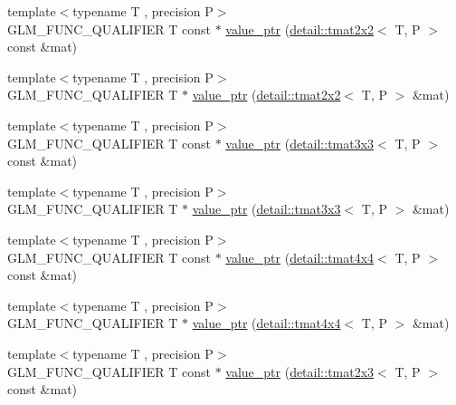 \begin{DoxyCompactItemize}
\item 
{\footnotesize template$<$typename T , precision P$>$ }\\G\-L\-M\-\_\-\-F\-U\-N\-C\-\_\-\-Q\-U\-A\-L\-I\-F\-I\-E\-R T const $\ast$ \hyperlink{group__gtc__type__ptr_ga013fcf415d78cc3aa9273c5d4f780325}{value\-\_\-ptr} (\hyperlink{structglm_1_1detail_1_1tmat2x2}{detail\-::tmat2x2}$<$ T, P $>$ const \&mat)
\item 
{\footnotesize template$<$typename T , precision P$>$ }\\G\-L\-M\-\_\-\-F\-U\-N\-C\-\_\-\-Q\-U\-A\-L\-I\-F\-I\-E\-R T $\ast$ \hyperlink{group__gtc__type__ptr_ga11e5b6c0d7d5d2627df624bb4b219f20}{value\-\_\-ptr} (\hyperlink{structglm_1_1detail_1_1tmat2x2}{detail\-::tmat2x2}$<$ T, P $>$ \&mat)
\item 
{\footnotesize template$<$typename T , precision P$>$ }\\G\-L\-M\-\_\-\-F\-U\-N\-C\-\_\-\-Q\-U\-A\-L\-I\-F\-I\-E\-R T const $\ast$ \hyperlink{group__gtc__type__ptr_ga78acb1fd15ce7d1d2861493fac9693ec}{value\-\_\-ptr} (\hyperlink{structglm_1_1detail_1_1tmat3x3}{detail\-::tmat3x3}$<$ T, P $>$ const \&mat)
\item 
{\footnotesize template$<$typename T , precision P$>$ }\\G\-L\-M\-\_\-\-F\-U\-N\-C\-\_\-\-Q\-U\-A\-L\-I\-F\-I\-E\-R T $\ast$ \hyperlink{group__gtc__type__ptr_gaad64150511d5c6a2d2c7afec724e4064}{value\-\_\-ptr} (\hyperlink{structglm_1_1detail_1_1tmat3x3}{detail\-::tmat3x3}$<$ T, P $>$ \&mat)
\item 
{\footnotesize template$<$typename T , precision P$>$ }\\G\-L\-M\-\_\-\-F\-U\-N\-C\-\_\-\-Q\-U\-A\-L\-I\-F\-I\-E\-R T const $\ast$ \hyperlink{group__gtc__type__ptr_gaa99522f78635f6949ebf82f065bafa94}{value\-\_\-ptr} (\hyperlink{structglm_1_1detail_1_1tmat4x4}{detail\-::tmat4x4}$<$ T, P $>$ const \&mat)
\item 
{\footnotesize template$<$typename T , precision P$>$ }\\G\-L\-M\-\_\-\-F\-U\-N\-C\-\_\-\-Q\-U\-A\-L\-I\-F\-I\-E\-R T $\ast$ \hyperlink{group__gtc__type__ptr_ga46c85fe444b7260c496be5fe0c146e87}{value\-\_\-ptr} (\hyperlink{structglm_1_1detail_1_1tmat4x4}{detail\-::tmat4x4}$<$ T, P $>$ \&mat)
\item 
{\footnotesize template$<$typename T , precision P$>$ }\\G\-L\-M\-\_\-\-F\-U\-N\-C\-\_\-\-Q\-U\-A\-L\-I\-F\-I\-E\-R T const $\ast$ \hyperlink{group__gtc__type__ptr_gad5c4faad7a4553c875bc45656fcae73c}{value\-\_\-ptr} (\hyperlink{structglm_1_1detail_1_1tmat2x3}{detail\-::tmat2x3}$<$ T, P $>$ const \&mat)

\end{DoxyCompactItemize}
